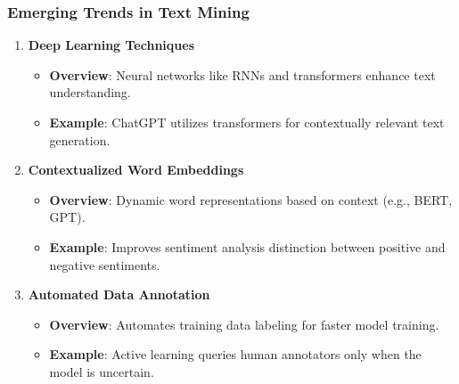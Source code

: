 \documentclass[aspectratio=169]{beamer}
\begin{document}
\begin{frame}[fragile]
    \frametitle{Emerging Trends in Text Mining}
    \begin{enumerate}
        \item \textbf{Deep Learning Techniques}  
            \begin{itemize}
                \item \textbf{Overview}: Neural networks like RNNs and transformers enhance text understanding.
                \item \textbf{Example}: ChatGPT utilizes transformers for contextually relevant text generation.
            \end{itemize}
        
        \item \textbf{Contextualized Word Embeddings}  
            \begin{itemize}
                \item \textbf{Overview}: Dynamic word representations based on context (e.g., BERT, GPT).
                \item \textbf{Example}: Improves sentiment analysis distinction between positive and negative sentiments.
            \end{itemize}
        
        \item \textbf{Automated Data Annotation}  
            \begin{itemize}
                \item \textbf{Overview}: Automates training data labeling for faster model training.
                \item \textbf{Example}: Active learning queries human annotators only when the model is uncertain.
            \end{itemize}
    \end{enumerate}
\end{frame}
\end{document}
